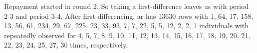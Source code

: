 Repayment started in round 2. So taking a first-difference leaves us with period 2-3 and period 3-4. After first-differencing, \textsf{ar} has 13630 rows with 1, 64, 17, 158, 13, 56, 61, 234, 29, 67, 225, 23, 33, 93, 7, 7, 22, 5, 5, 12, 2, 2, 1 individuals with repeatedly observed for 4, 5, 7, 8, 9, 10, 11, 12, 13, 14, 15, 16, 17, 18, 19, 20, 21, 22, 23, 24, 25, 27, 30 times, respectively. 

